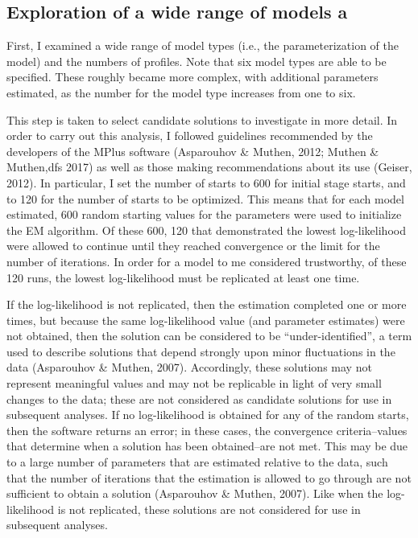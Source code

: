 \documentclass[]{book}
\theoremstyle{definition}
\theoremstyle{definition}
\theoremstyle{definition}
\theoremstyle{remark}
\begin{document}
\subsection{Exploration of a wide range of models
a}\label{exploration-of-a-wide-range-of-models-a}

First, I examined a wide range of model types (i.e., the
parameterization of the model) and the numbers of profiles. Note that
six model types are able to be specified. These roughly became more
complex, with additional parameters estimated, as the number for the
model type increases from one to six.

This step is taken to select candidate solutions to investigate in more
detail. In order to carry out this analysis, I followed guidelines
recommended by the developers of the MPlus software (Asparouhov \&
Muthen, 2012; Muthen \& Muthen,dfs 2017) as well as those making
recommendations about its use (Geiser, 2012). In particular, I set the
number of starts to 600 for initial stage starts, and to 120 for the
number of starts to be optimized. This means that for each model
estimated, 600 random starting values for the parameters were used to
initialize the EM algorithm. Of these 600, 120 that demonstrated the
lowest log-likelihood were allowed to continue until they reached
convergence or the limit for the number of iterations. In order for a
model to me considered trustworthy, of these 120 runs, the lowest
log-likelihood must be replicated at least one time.

If the log-likelihood is not replicated, then the estimation completed
one or more times, but because the same log-likelihood value (and
parameter estimates) were not obtained, then the solution can be
considered to be ``under-identified'', a term used to describe solutions
that depend strongly upon minor fluctuations in the data (Asparouhov \&
Muthen, 2007). Accordingly, these solutions may not represent meaningful
values and may not be replicable in light of very small changes to the
data; these are not considered as candidate solutions for use in
subsequent analyses. If no log-likelihood is obtained for any of the
random starts, then the software returns an error; in these cases, the
convergence criteria--values that determine when a solution has been
obtained--are not met. This may be due to a large number of parameters
that are estimated relative to the data, such that the number of
iterations that the estimation is allowed to go through are not
sufficient to obtain a solution (Asparouhov \& Muthen, 2007). Like when
the log-likelihood is not replicated, these solutions are not considered
for use in subsequent analyses.
\end{document}
